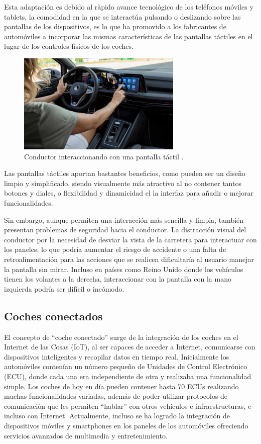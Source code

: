 \documentclass[12pt]{report} %
\begin{document}
Esta adaptación es debido al ràpido avance tecnológico de los teléfonos móviles y tablets, la comodidad en la que se interactúa pulsando o deslizando sobre las pantallas de los dispositivos, es lo que ha promovido a los fabricantes de automóviles a incorporar las mismas características de las pantallas táctiles en el lugar de los controles físicos de los coches.  

\begin{figure}[h]
    \centering
    \includegraphics[width=0.7\textwidth]{usingTouchscreen.png}
    \caption{Conductor interaccionando con una pantalla táctil \cite{userExperience}.}
    \label{fig:imagen2}
\end{figure}

Las pantallas táctiles aportan bastantes beneficios, como pueden ser un diseño limpio y simplificado, siendo visualmente más atractivo al no contener tantos botones y diales, o flexibilidad y dinamicidad el la interfaz para añadir o mejorar funcionalidades.

Sin embargo, aunque permiten una interacción más sencilla y limpia, también presentan problemas de seguridad hacia el conductor. La distracción visual del conductor por la necesidad de desviar la vista de la carretera para interactuar con los paneles, lo que podría aumentar el riesgo de accidente o una falta de retroalimentación para las acciones que se realicen dificultaría al usuario manejar la pantalla sin mirar. Incluso en países como Reino Unido donde los vehículos tienen los volantes a la derecha, interaccionar con la pantalla con la mano izquierda podría ser difícil o incómodo. 

\subsection{Coches conectados}

El concepto de “coche conectado” surge de la integración de los coches en el Internet de las Cosas (IoT), al ser capaces de acceder a Internet, comunicarse con dispositivos inteligentes y recopilar datos en tiempo real. Inicialmente los automóviles contenían un número pequeño de Unidades de Control Electrónico (ECU), donde cada una era independiente de otra y realizaba una funcionalidad simple. Los coches de hoy en día pueden contener hasta 70 ECUs realizando muchas funcionalidades variadas, además de poder utilizar protocolos de comunicación que les permiten “hablar” con otros vehículos e infraestructuras, e incluso con Internet. Actualmente, incluso se ha logrado la integración de dispositivos móviles y smartphones en los paneles de los automóviles ofreciendo servicios avanzados de multimedia y entretenimiento. 
\cite{mobileIntegration}
\end{document}
